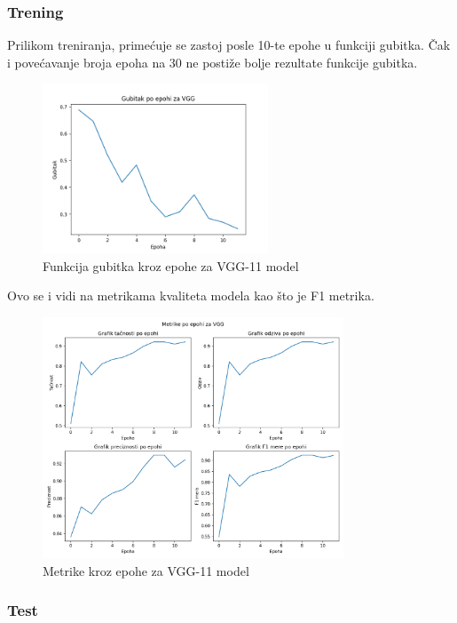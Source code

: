 \documentclass{article}
\begin{document}
\subsubsection{Trening}

Prilikom treniranja, primećuje se zastoj posle 10-te epohe u funkciji gubitka. Čak i povećavanje broja epoha na 30 ne postiže bolje rezultate funkcije gubitka.

\begin{figure}[H]
    \centering
    \includegraphics[width=0.6\textwidth]{rezultati/VGG_gubitak_po_epohi.png} 
    \caption{Funkcija gubitka kroz epohe za VGG-11 model} 
    \label{VGG gubitak po epohi}
\end{figure}

Ovo se i vidi na metrikama kvaliteta modela kao što je F1 metrika.

\begin{figure}[H]
    \centering
    \includegraphics[width=0.8\textwidth]{rezultati/VGG_metrike_po_epohi.png} 
    \caption{Metrike kroz epohe za VGG-11 model} 
    \label{VGG metrike po epohi}
\end{figure}

\subsubsection{Test}
\end{document}
